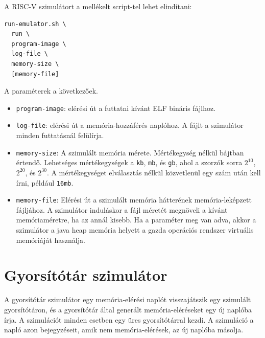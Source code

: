 \documentclass[12pt]{report}
\begin{document}
A RISC-V szimulátort a mellékelt script-tel lehet elindítani:
\begin{verbatim}
run-emulator.sh \
  run \
  program-image \
  log-file \
  memory-size \
  [memory-file]
\end{verbatim}
A paraméterek a következőek.
\begin{itemize}
\item \texttt{program-image}: elérési út a futtatni kívánt ELF bináris fájlhoz.
\item \texttt{log-file}: elérési út a memória-hozzáférés naplóhoz.
A fájlt a szimulátor minden futtatásnál felülírja.
\item \texttt{memory-size}: A szimulált memória mérete.
Mértékegység nélkül bájtban értendő.
Lehetséges mértékegységek a \texttt{kb}, \texttt{mb}, és \texttt{gb},
ahol a szorzók sorra $2^{10}$, $2^{20}$, és $2^{30}$.
A mértékegységet elválasztás nélkül közvetlenül
egy szám után kell írni, például \texttt{16mb}.
\item \texttt{memory-file}:
Elérési út a szimulált memória hátterének memória-leképzett fájljához.
A szimulátor induláskor a fájl méretét megnöveli a kívánt
memóriaméretre, ha az annál kisebb.
Ha a paraméter meg van adva, akkor a szimulátor
a java heap memória helyett a gazda operációs rendszer virtuális
memóriáját használja.
\end{itemize}

\section{Gyorsítótár szimulátor}

A gyorsítótár szimulátor egy memória-elérési naplót
visszajátszik egy szimulált gyorsítótáron,
és a gyorsítótár által generált memória-eléréseket
egy új naplóba írja.
A szimulációt minden esetben egy üres gyorsítótárral kezdi.
A szimuláció a napló azon bejegyzéseit, amik nem memória-elérések,
az új naplóba másolja.
\end{document}
